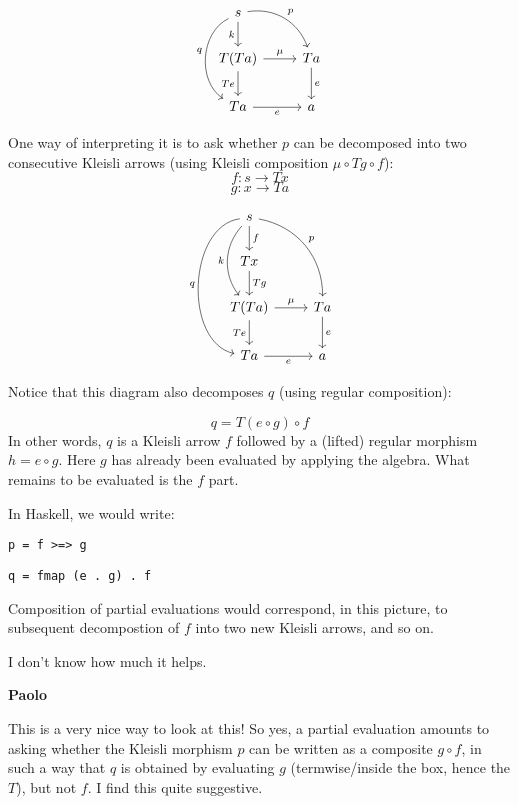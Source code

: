 \documentclass{amsart}
\newcommand{\respond}[1]{
  \vspace{1em} \textbf{#1}
}
\begin{document}
\begin{equation*}
\begin{tikzcd}
s
\arrow[d, "k"']
\arrow[dr, bend left=40, "p"]
\arrow[dd, bend right = 60, "q"']\\
T(T a)
\arrow[r, "\mu"]
\arrow[d, "T e"']
& T a
\arrow[d, "e"]
\\
T a
\arrow[r, "e"']
& a
\end{tikzcd}
\end{equation*}

One way of interpreting it is to ask whether $p$ can be decomposed into two consecutive Kleisli arrows (using Kleisli composition $\mu \circ T g \circ f$):
$$f \colon s \to T x$$
$$g \colon x \to T a$$

\begin{equation*}
\begin{tikzcd}
s
\arrow[d, "f"]
\arrow[dd, bend right = 40, "k"']
\arrow[ddd, bend right = 80, "q"']
\arrow[ddr, bend left=40, "p"]\\
T x
\arrow[d, "T g"]\\
T(T a)
\arrow[r, "\mu"]
\arrow[d, "T e"']
& T a
\arrow[d, "e"]
\\
T a
\arrow[r, "e"']
& a
\end{tikzcd}
\end{equation*}

Notice that this diagram also decomposes $q$ (using regular composition):

$$ q = T(e \circ g) \circ f$$
In other words, $q$ is a Kleisli arrow $f$ followed by a (lifted) regular morphism $h = e \circ g$. Here $g$ has already been evaluated by applying the algebra. What remains to be evaluated is the $f$ part.

In Haskell, we would write:

\verb|p = f >=> g|

\verb|q = fmap (e . g) . f|

Composition of partial evaluations would correspond, in this picture, to subsequent decompostion of $f$ into two new Kleisli arrows, and so on.

I don't know how much it helps.


\respond{Paolo}

This is a very nice way to look at this! So yes, a partial evaluation amounts to asking whether the Kleisli morphism $p$ can be written as a composite $g\circ f$, in such a way that $q$ is obtained by evaluating $g$ (termwise/inside the box, hence the $T$), but not $f$. I find this quite suggestive.
\end{document}
